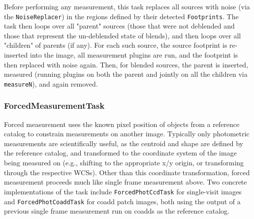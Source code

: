 Before performing any measurement, this task replaces all sources with noise (via the \texttt{NoiseReplacer}) in the regions defined by their detected \texttt{Footprints}.
The task then loops over all "parent" sources (those that were not deblended and those that represent the un-deblended state of blends), and then loops over all "children" of parents (if any).
For each such source, the source footprint is re-inserted into the image, all measurement plugins are run, and the footprint is then replaced with noise again.
Then, for blended sources, the parent is inserted, measured (running plugins on both the parent and jointly on all the children via \texttt{measureN}), and again removed.

\subsubsection{ForcedMeasurementTask}
\label{sec:ForcedMeasurementTask}

Forced measurement uses the known pixel position of objects from a reference catalog to constrain measurements on another image.
Typically only photometric measurements are scientifically useful, as the centroid and shape are defined by the reference catalog, and transformed to the coordinate system of the image being measured on (e.g., shifting to the appropriate x/y origin, or transforming through the respective WCSs).
Other than this coordinate transformation, forced measurement proceeds much like single frame measurement above.
Two concrete implementations of the task include \texttt{ForcedPhotCcdTask} for single-visit images and \texttt{ForcedPhotCoaddTask} for coadd patch images, both using the output of a previous single frame measurement run on coadds as the reference catalog.










